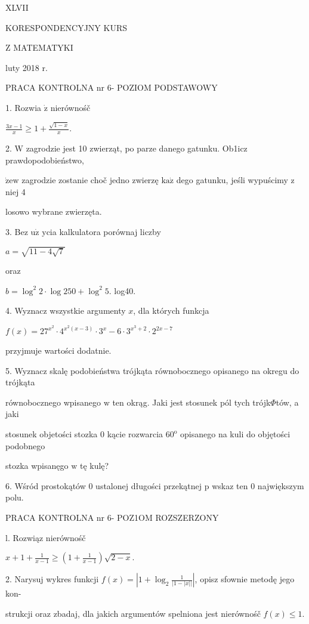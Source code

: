 \documentclass[a4paper,12pt]{article}
\begin{document}
XLVII

KORESPONDENCYJNY KURS

Z MATEMATYKI

luty 2018 r.

PRACA KONTROLNA nr 6- POZIOM PODSTAWOWY

1. Rozwia $\dot{\mathrm{z}}$ nierównośč

$\displaystyle \frac{3x-1}{x}\geq 1+\frac{\sqrt{1-x}}{x}.$

2. $\mathrm{W}$ zagrodzie jest 10 zwierząt, po parze danego gatunku. Ob1icz prawdopodobieństwo,

$\dot{\mathrm{z}}\mathrm{e}\mathrm{w}$ zagrodzie zostanie choč jedno zwierzę $\mathrm{k}\mathrm{a}\dot{\mathrm{z}}$ dego gatunku, jeśli wypuścimy $\mathrm{z}$ niej 4

losowo wybrane zwierzęta.

3. Bez $\mathrm{u}\dot{\mathrm{z}}$ ycia kalkulatora porównaj liczby

$a=\sqrt{11-4\sqrt{7}}$

oraz

$b=\log^{2}2\cdot\log 250+\log^{2}5$. log40.

4. Wyznacz wszystkie argumenty $x$, dla których funkcja

$f(x)=27^{x^{2}}\cdot 4^{x^{2}(x-3)}\cdot 3^{x}-6\cdot 3^{x^{3}+2}\cdot 2^{2x-7}$

przyjmuje wartości dodatnie.

5. Wyznacz skalę podobieństwa trójkąta równobocznego opisanego na okregu do trójkąta

równobocznego wpisanego $\mathrm{w}$ ten okrąg. Jaki jest stosunek pól tych trójk$\Phi$tów, a jaki

stosunek objetości stozka $0$ kącie rozwarcia $60^{\mathrm{o}}$ opisanego na kuli do objętości podobnego

stozka wpisanęgo $\mathrm{w}$ tę kulę?

6. Wśród prostokątów 0 ustalonej długości przekątnej p wskaz ten 0 największym polu.




PRACA KONTROLNA nr 6- POZ1OM ROZSZERZONY

l. Rozwiąz nierównośč

$x+1+\displaystyle \frac{1}{x-1}\geq(1+\frac{1}{x-1})\sqrt{2-x}.$

2. Narysuj wykres funkcji $f(x) = |1+ \displaystyle \log_{2}\frac{1}{|1-|x||}|$, opisz sfownie metodę jego kon-

strukcji oraz zbadaj, dla jakich argumentów spelniona jest nierównośč $f(x)\leq 1.$
\end{document}
